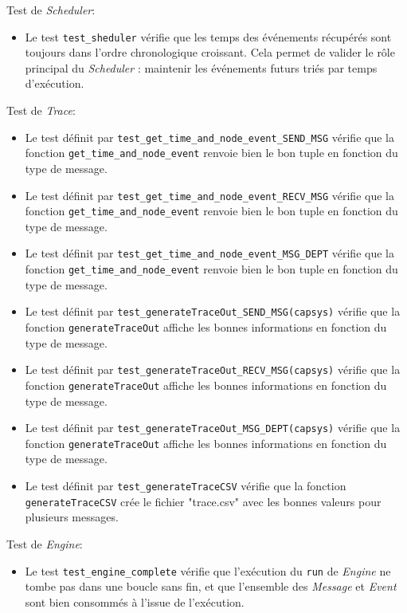 \documentclass[11pt,a4paper]{article}
\begin{document}
\bigskip

Test de \emph{Scheduler}:
\begin{itemize}
    \item Le test \lstinline|test_sheduler| vérifie que les temps des événements récupérés sont toujours dans l'ordre chronologique croissant. Cela permet de valider le rôle principal du \emph{Scheduler} : maintenir les événements futurs triés par temps d'exécution.
\end{itemize}

\bigskip

Test de \emph{Trace}:
\begin{itemize}
    \item Le test définit par \lstinline|test_get_time_and_node_event_SEND_MSG| vérifie que la fonction \lstinline|get_time_and_node_event| renvoie bien le bon tuple en fonction du type de message.
    \item Le test définit par \lstinline|test_get_time_and_node_event_RECV_MSG| vérifie que la fonction \lstinline|get_time_and_node_event| renvoie bien le bon tuple en fonction du type de message.
    \item Le test définit par \lstinline|test_get_time_and_node_event_MSG_DEPT| vérifie que la fonction \lstinline|get_time_and_node_event| renvoie bien le bon tuple en fonction du type de message.
    \item Le test définit par \lstinline|test_generateTraceOut_SEND_MSG(capsys)| vérifie que la fonction \lstinline|generateTraceOut| affiche les bonnes informations en fonction du type de message.
    \item Le test définit par \lstinline|test_generateTraceOut_RECV_MSG(capsys)| vérifie que la fonction \lstinline|generateTraceOut| affiche les bonnes informations en fonction du type de message.
    \item Le test définit par \lstinline|test_generateTraceOut_MSG_DEPT(capsys)| vérifie que la fonction \lstinline|generateTraceOut| affiche les bonnes informations en fonction du type de message.
    \item Le test définit par \lstinline|test_generateTraceCSV| vérifie que la fonction \lstinline|generateTraceCSV| crée le fichier "trace.csv" avec les bonnes valeurs pour plusieurs messages.
\end{itemize}

\bigskip

Test de \emph{Engine}:
\begin{itemize}
    \item Le test \lstinline|test_engine_complete| vérifie que l'exécution du \lstinline|run| de \emph{Engine} ne tombe pas dans une boucle sans fin, et que l'ensemble des \emph{Message} et \emph{Event} sont bien consommés à l'issue de l'exécution.
\end{itemize}
\end{document}
